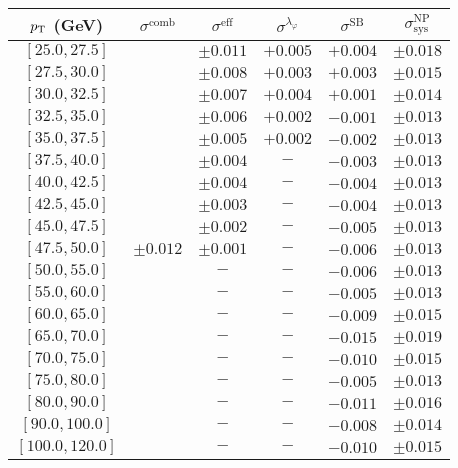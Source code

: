 \begin{tabular}{c||c|c|c|c||c}
$p_\text{T}$ (GeV) & $\sigma^{\text{comb}}$ & $\sigma^{\text{eff}}$ & $\sigma^{\lambda_\varphi}$ & $\sigma^{\text{SB}}$ & $\sigma_{\text{sys}}^{\text{NP}}$ \\
\hline
$[25.0, 27.5]$ & \multirow{19}{*}{$\pm0.012$} & $\pm0.011$ & $+0.005$ & $+0.004$ & $\pm0.018$\\
$[27.5, 30.0]$ &  & $\pm0.008$ & $+0.003$ & $+0.003$ & $\pm0.015$\\
$[30.0, 32.5]$ &  & $\pm0.007$ & $+0.004$ & $+0.001$ & $\pm0.014$\\
$[32.5, 35.0]$ &  & $\pm0.006$ & $+0.002$ & $-0.001$ & $\pm0.013$\\
$[35.0, 37.5]$ &  & $\pm0.005$ & $+0.002$ & $-0.002$ & $\pm0.013$\\
$[37.5, 40.0]$ &  & $\pm0.004$ & $-$ & $-0.003$ & $\pm0.013$\\
$[40.0, 42.5]$ &  & $\pm0.004$ & $-$ & $-0.004$ & $\pm0.013$\\
$[42.5, 45.0]$ &  & $\pm0.003$ & $-$ & $-0.004$ & $\pm0.013$\\
$[45.0, 47.5]$ &  & $\pm0.002$ & $-$ & $-0.005$ & $\pm0.013$\\
$[47.5, 50.0]$ &  & $\pm0.001$ & $-$ & $-0.006$ & $\pm0.013$\\
$[50.0, 55.0]$ &  & $-$ & $-$ & $-0.006$ & $\pm0.013$\\
$[55.0, 60.0]$ &  & $-$ & $-$ & $-0.005$ & $\pm0.013$\\
$[60.0, 65.0]$ &  & $-$ & $-$ & $-0.009$ & $\pm0.015$\\
$[65.0, 70.0]$ &  & $-$ & $-$ & $-0.015$ & $\pm0.019$\\
$[70.0, 75.0]$ &  & $-$ & $-$ & $-0.010$ & $\pm0.015$\\
$[75.0, 80.0]$ &  & $-$ & $-$ & $-0.005$ & $\pm0.013$\\
$[80.0, 90.0]$ &  & $-$ & $-$ & $-0.011$ & $\pm0.016$\\
$[90.0, 100.0]$ &  & $-$ & $-$ & $-0.008$ & $\pm0.014$\\
$[100.0, 120.0]$ &  & $-$ & $-$ & $-0.010$ & $\pm0.015$\\
\end{tabular}
